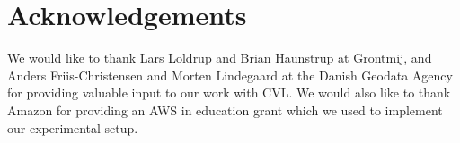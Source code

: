 \section{Acknowledgements}
We would like to thank Lars Loldrup and Brian Haunstrup at Grontmij, and Anders Friis-Christensen and Morten Lindegaard at the Danish Geodata Agency for providing valuable input to our work with CVL. We would also like to thank Amazon for providing an AWS in education grant which we used to implement our experimental setup.